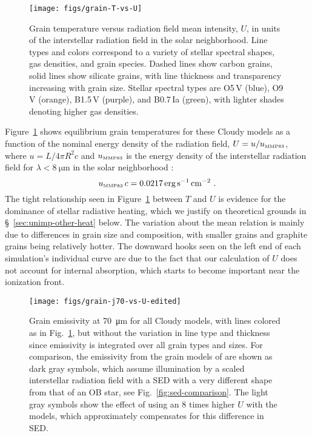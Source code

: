 \documentclass[useAMS, usenatbib, a4paper]{mnras}
\newcommand\mmp{\ensuremath{_{\text{\tiny MMP83}}}}
\begin{document}
\begin{figure}
  \centering
  \texttt{[image: figs/grain-T-vs-U]}
  \caption{Grain temperature versus radiation field mean intensity,
    \(U\), in units of the interstellar radiation field in the solar
    neighborhood.  Line types and colors correspond to a variety of
    stellar spectral shapes, gas densities, and grain species.  Dashed
    lines show carbon grains, solid lines show silicate grains, with
    line thickness and transparency increasing with grain size.
    Stellar spectral types are O5\,V (blue), O9\,V (orange), B1.5\,V
    (purple), and B0.7\,Ia (green), with lighter shades denoting
    higher gas densities. }
  \label{fig:grain-T-vs-U}
\end{figure}

Figure~\ref{fig:grain-T-vs-U} shows equilibrium grain temperatures for
these Cloudy models as a function of the nominal energy density of the
radiation field, \(U = u / u\mmp \), where \(u = L / 4 \pi R^2 c\) and
\(u\mmp\) is the energy density of the interstellar radiation field
for \(\lambda < \SI{8}{\um}\) in the solar neighborhood
\citep{Mathis:1983a}:
\begin{equation}
  \label{eq:u-mmp83}
  u\mmp\,c = \SI{0.0217}{erg.s^{-1}.cm^{-2}} \ .
\end{equation}
The tight relationship seen in Figure~\ref{fig:grain-T-vs-U} between
\(T\) and \(U\) is evidence for the dominance of stellar radiative
heating, which we justify on theoretical grounds in
\S~\ref{sec:unimp-other-heat} below.  The variation about the mean
relation is mainly due to differences in grain size and composition,
with smaller grains and graphite grains being relatively hotter.  The
downward hooks seen on the left end of each simulation's individual
curve are due to the fact that our calculation of \(U\) does not
account for internal absorption, which starts to become important near
the ionization front.

\begin{figure}
  \centering
  \texttt{[image: figs/grain-j70-vs-U-edited]}
  \caption{Grain emissivity at \SI{70}{\um} for all Cloudy models,
    with lines colored as in Fig.~\ref{fig:grain-T-vs-U}, but without
    the variation in line type and thickness since emissivity is
    integrated over all grain types and sizes.  For comparison, the
    emissivity from the grain models of \citet{Draine:2007a} are shown
    as dark gray symbols, which assume illumination by a scaled
    interstellar radiation field with a SED with a very different
    shape from that of an OB star, see Fig.~\ref{fig:sed-comparison}.
    The light gray symbols show the effect of using an 8 times higher
    \(U\) with the \citeauthor{Draine:2007a} models, which
    approximately compensates for this difference in SED.  }
  \label{fig:grain-j70}
\end{figure}
\end{document}
